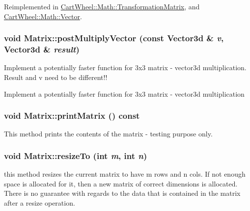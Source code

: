Reimplemented in \hyperlink{classCartWheel_1_1Math_1_1TransformationMatrix_ab04a5715c7f1ff7dd912b34abfce10c4}{CartWheel::Math::TransformationMatrix}, and \hyperlink{classCartWheel_1_1Math_1_1Vector_a1ec609f24d97d79e99b6bfc8759863e1}{CartWheel::Math::Vector}.

\hypertarget{classCartWheel_1_1Math_1_1Matrix_a51c6fb9367bb553ad892ab54ed663c59}{
\subsubsection[{postMultiplyVector}]{\setlength{\rightskip}{0pt plus 5cm}void Matrix::postMultiplyVector (const {\bf Vector3d} \& {\em v}, \/  {\bf Vector3d} \& {\em result})}}
\label{classCartWheel_1_1Math_1_1Matrix_a51c6fb9367bb553ad892ab54ed663c59}
Implement a potentially faster function for 3x3 matrix -\/ vector3d multiplication. Result and v need to be different!!

Implement a potentially faster function for 3x3 matrix -\/ vector3d multiplication \hypertarget{classCartWheel_1_1Math_1_1Matrix_a31515ccb097bdaa77027cb1f315cd713}{
\subsubsection[{printMatrix}]{\setlength{\rightskip}{0pt plus 5cm}void Matrix::printMatrix () const}}
\label{classCartWheel_1_1Math_1_1Matrix_a31515ccb097bdaa77027cb1f315cd713}
This method prints the contents of the matrix -\/ testing purpose only. \hypertarget{classCartWheel_1_1Math_1_1Matrix_aa281a0802c0826225f68d2f5859a5b18}{
\subsubsection[{resizeTo}]{\setlength{\rightskip}{0pt plus 5cm}void Matrix::resizeTo (int {\em m}, \/  int {\em n})}}
\label{classCartWheel_1_1Math_1_1Matrix_aa281a0802c0826225f68d2f5859a5b18}
this method resizes the current matrix to have m rows and n cols. If not enough space is allocated for it, then a new matrix of correct dimensions is allocated. There is no guarantee with regards to the data that is contained in the matrix after a resize operation.

